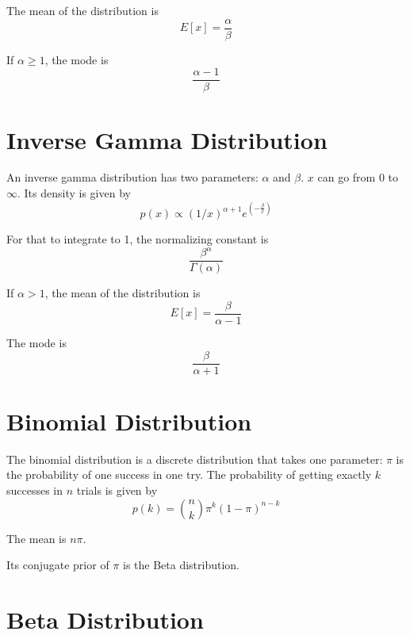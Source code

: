 \documentclass[12pt]{article}
\begin{document}
The mean of the distribution is
\begin{equation*}
E[x] = \frac{ \alpha}{\beta}
\end{equation*}

If $\alpha \geq 1$, the mode is 
\begin{equation*}
\frac{ \alpha - 1}{\beta}
\end{equation*}


\section*{Inverse Gamma Distribution}

An inverse gamma distribution has two parameters: $\alpha$ and $\beta$. $x$ can go from $0$ to $\infty$. Its density is given by
\begin{equation*}
p(x) \propto 
(1/x)^{\alpha + 1}e^{\left(-\frac{\beta}{x}\right)}
\end{equation*}

For that to integrate to 1, the normalizing constant is
\begin{equation*}
\frac{\beta^\alpha}{\Gamma(\alpha)}
\end{equation*}

If $\alpha > 1$, the mean of the distribution is
\begin{equation*}
E[x] = \frac{ \beta}{\alpha - 1} 
\end{equation*}

The mode is 
\begin{equation*}
\frac{ \beta}{\alpha + 1}
\end{equation*}

\section*{Binomial Distribution}

The binomial distribution is a discrete distribution that takes one parameter: $\pi$ is the probability of one success in one try. The probability of getting exactly $k$ successes in $n$ trials is given by
\begin{equation*}
p(k) = \binom{n}{k}\pi^k(1-\pi)^{n-k}
\end{equation*}

The mean is $n\pi$.

Its conjugate prior of $\pi$ is the Beta distribution.

\section*{Beta Distribution}
\end{document}
